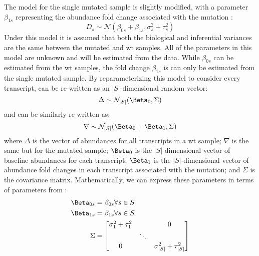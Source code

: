 The model for the single mutated sample is slightly modified, with a parameter $\beta_{1s}$ representing the abundance fold change associated with the mutation \cite{pimentelDifferentialAnalysisRNAseq2017,loveModeratedEstimationFold2014}:
%
\begin{equation}
  D_s \sim \mathcal{N} \left( \beta_{0s} + \beta_{1s}, \sigma_s^2 + \tau_s^2 \right)
  \label{eqn:single_mut_model}
\end{equation}
%
Under this model it is assumed that both the biological and inferential variances are the same between the mutated and \gls{wt} samples.
All of the parameters in this model are unknown and will be estimated from the data.
While $\beta_{0s}$ can be estimated from the \gls{wt} samples, the fold change $\beta_{1s}$ is can only be estimated from the single mutated sample.
By reparameterizing this model to consider every transcript,  can be re-written as an $|S|$-dimensional random vector:
%
\begin{equation}
  \Delta \sim \mathcal{N}_{|S|}(\Beta_0, \Sigma) \\
  \label{eqn:delta_wt}
\end{equation}
%
and  can be similarly re-written as:
%
\begin{equation}
  \nabla \sim \mathcal{N}_{|S|}(\Beta_0 + \Beta_1, \Sigma) \\
  \label{eqn:delta_mut}
\end{equation}
%
where $\Delta$ is the vector of abundances for all transcripts in a \gls{wt} sample; $\nabla$ is the same but for the mutated sample; $\Beta_0$ is the $|S|$-dimensional vector of baseline abundances for each transcript; $\Beta_1$ is the $|S|$-dimensional vector of abundance fold changes in each transcript associated with the mutation; and $\Sigma$ is the covariance matrix.
Mathematically, we can express these parameters in terms of parameters from :
%
\begin{align*}
  \Beta_{0s} & = \beta_{0s} \forall s \in S \\
  \Beta_{1s} & = \beta_{1s} \forall s \in S \\
  \Sigma     & = \begin{bmatrix}
    \sigma_1^2 + \tau_1^2 &        & 0                             \\
                          & \ddots                                 \\
    0                     &        & \sigma_{|S|}^2 + \tau_{|S|}^2 \\
  \end{bmatrix}
\end{align*}

